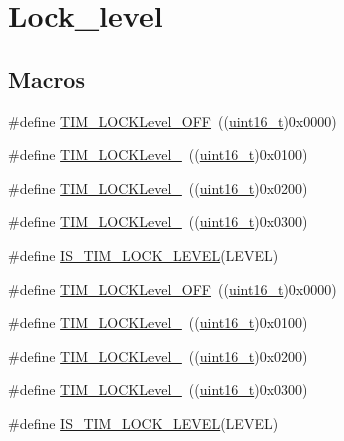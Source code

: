 \hypertarget{group___lock__level}{}\section{Lock\+\_\+level}
\label{group___lock__level}
\subsection*{Macros}
\begin{DoxyCompactItemize}
\item 
\#define \hyperlink{group___lock__level_ga84d318c62d3e5dfe7082610d03e11f2f}{T\+I\+M\+\_\+\+L\+O\+C\+K\+Level\+\_\+\+O\+FF}~((\hyperlink{_p_e___types_8h_a1f1825b69244eb3ad2c7165ddc99c956}{uint16\+\_\+t})0x0000)
\item 
\#define \hyperlink{group___lock__level_ga7e4326fc7756ebf5e9eb9776c2734aea}{T\+I\+M\+\_\+\+L\+O\+C\+K\+Level\+\_}~((\hyperlink{_p_e___types_8h_a1f1825b69244eb3ad2c7165ddc99c956}{uint16\+\_\+t})0x0100)
\item 
\#define \hyperlink{group___lock__level_ga91bdf218f766e6a10b7a7df407250d25}{T\+I\+M\+\_\+\+L\+O\+C\+K\+Level\+\_}~((\hyperlink{_p_e___types_8h_a1f1825b69244eb3ad2c7165ddc99c956}{uint16\+\_\+t})0x0200)
\item 
\#define \hyperlink{group___lock__level_gaa0a0c1ffd9dc582d6571780c1747920b}{T\+I\+M\+\_\+\+L\+O\+C\+K\+Level\+\_}~((\hyperlink{_p_e___types_8h_a1f1825b69244eb3ad2c7165ddc99c956}{uint16\+\_\+t})0x0300)
\item 
\#define \hyperlink{group___lock__level_gacf5e70717f6d13af301331bb043f5d48}{I\+S\+\_\+\+T\+I\+M\+\_\+\+L\+O\+C\+K\+\_\+\+L\+E\+V\+EL}(L\+E\+V\+EL)
\item 
\#define \hyperlink{group___lock__level_ga84d318c62d3e5dfe7082610d03e11f2f}{T\+I\+M\+\_\+\+L\+O\+C\+K\+Level\+\_\+\+O\+FF}~((\hyperlink{_p_e___types_8h_a1f1825b69244eb3ad2c7165ddc99c956}{uint16\+\_\+t})0x0000)
\item 
\#define \hyperlink{group___lock__level_ga7e4326fc7756ebf5e9eb9776c2734aea}{T\+I\+M\+\_\+\+L\+O\+C\+K\+Level\+\_}~((\hyperlink{_p_e___types_8h_a1f1825b69244eb3ad2c7165ddc99c956}{uint16\+\_\+t})0x0100)
\item 
\#define \hyperlink{group___lock__level_ga91bdf218f766e6a10b7a7df407250d25}{T\+I\+M\+\_\+\+L\+O\+C\+K\+Level\+\_}~((\hyperlink{_p_e___types_8h_a1f1825b69244eb3ad2c7165ddc99c956}{uint16\+\_\+t})0x0200)
\item 
\#define \hyperlink{group___lock__level_gaa0a0c1ffd9dc582d6571780c1747920b}{T\+I\+M\+\_\+\+L\+O\+C\+K\+Level\+\_}~((\hyperlink{_p_e___types_8h_a1f1825b69244eb3ad2c7165ddc99c956}{uint16\+\_\+t})0x0300)
\item 
\#define \hyperlink{group___lock__level_gacf5e70717f6d13af301331bb043f5d48}{I\+S\+\_\+\+T\+I\+M\+\_\+\+L\+O\+C\+K\+\_\+\+L\+E\+V\+EL}(L\+E\+V\+EL)
\end{DoxyCompactItemize}


